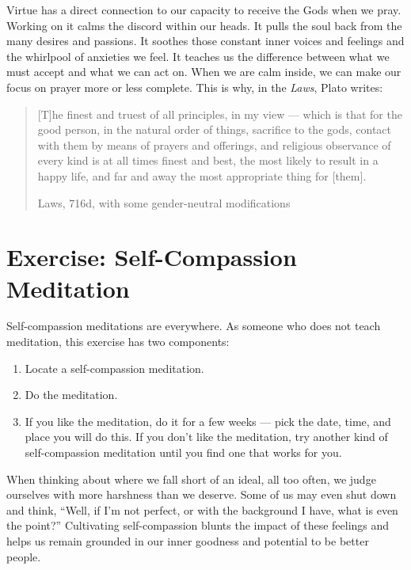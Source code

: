 \documentclass[
]{book}
\providecommand{\tightlist}{%
  \setlength{\itemsep}{0pt}\setlength{\parskip}{0pt}}
\begin{document}
Virtue has a direct connection to our capacity to receive the Gods when we pray. Working on it calms the discord within our heads. It pulls the soul back from the many desires and passions. It soothes those constant inner voices and feelings and the whirlpool of anxieties we feel. It teaches us the difference between what we must accept and what we can act on. When we are calm inside, we can make our focus on prayer more or less complete. This is why, in the \emph{Laws}, Plato writes:

\begin{quote}
{[}T{]}he finest and truest of all principles, in my view --- which is that for the good person, in the natural order of things, sacrifice to the gods, contact with them by means of prayers and offerings, and religious observance of every kind is at all times finest and best, the most likely to result in a happy life, and far and away the most appropriate thing for {[}them{]}.

Laws, 716d, with some gender-neutral modifications
\end{quote}

\hypertarget{exercise-self-compassion-meditation}{%
\section{Exercise: Self-Compassion Meditation}\label{exercise-self-compassion-meditation}}

Self-compassion meditations are everywhere. As someone who does not teach meditation, this exercise has two components:

\begin{enumerate}
\def\labelenumi{\arabic{enumi}.}
\tightlist
\item
  Locate a self-compassion meditation.
\item
  Do the meditation.
\item
  If you like the meditation, do it for a few weeks --- pick the date, time, and place you will do this. If you don't like the meditation, try another kind of self-compassion meditation until you find one that works for you.
\end{enumerate}

When thinking about where we fall short of an ideal, all too often, we judge ourselves with more harshness than we deserve. Some of us may even shut down and think, ``Well, if I'm not perfect, or with the background I have, what is even the point?'' Cultivating self-compassion blunts the impact of these feelings and helps us remain grounded in our inner goodness and potential to be better people.
\end{document}
